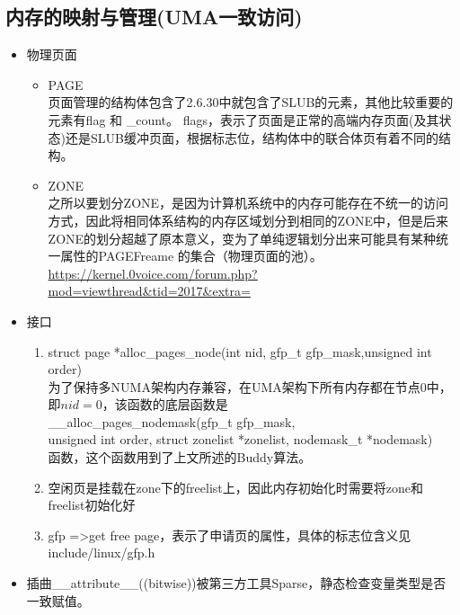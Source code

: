     \subsection{内存的映射与管理(UMA一致访问)}
		\begin{itemize}
			\item 物理页面\\
			\begin{itemize}
    		\item PAGE\\
    		页面管理的结构体包含了2.6.30中就包含了SLUB的元素，其他比较重要的元素有flag 和 \_count。
    		flags，表示了页面是正常的高端内存页面(及其状态)还是SLUB缓冲页面，根据标志位，结构体中的联合体页有着不同的结构。
    		\item ZONE\\
    		之所以要划分ZONE，是因为计算机系统中的内存可能存在不统一的访问方式，因此将相同体系结构的内存区域划分到相同的ZONE中，但是后来ZONE的划分超越了原本意义，变为了单纯逻辑划分出来可能具有某种统一属性的PAGE\quad Freame 的集合（物理页面的池）。\\
    		\url{https://kernel.0voice.com/forum.php?mod=viewthread&tid=2017&extra=}
    		\end{itemize}
    	\item 接口\\
    	\begin{enumerate}
    		\item struct page *alloc\_pages\_node(int nid, gfp\_t gfp\_mask,unsigned int order)\\
    		为了保持多NUMA架构内存兼容，在UMA架构下所有内存都在节点0中，即$nid=0$，该函数的底层函数是\\\_\_alloc\_pages\_nodemask(gfp\_t gfp\_mask,\\ unsigned int order,
    		struct zonelist *zonelist, nodemask\_t *nodemask)\\函数，这个函数用到了上文所述的Buddy算法。
    		\item 空闲页是挂载在zone下的freelist上，因此内存初始化时需要将zone和freelist初始化好
    		\item gfp =>get free page，表示了申请页的属性，具体的标志位含义见include/linux/gfp.h
    	\end{enumerate}
    	\item 插曲\_\_attribute\_\_((bitwise))被第三方工具Sparse，静态检查变量类型是否一致赋值。
    	\end{itemize}
